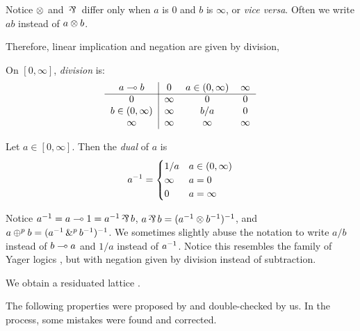 Notice $\otimes{}$ and $\dismul{}$ differ only when $a$ is $0$ and $b$ is $\infty$, or \textit{vice versa}. Often we write $ab$ instead of $a \otimes{} b$.

Therefore, linear implication and negation are given by division, 

\begin{definition}[Division]
\label{Division}
    On $[0,\infty]$, \emph{division} is:
    \begin{equation*}
		\begin{tabular}{c|ccc}
			$a \ediv{} b$ & $0$ & $a \in (0,\infty)$ & $\infty$\\
			\cline{1-4}
			$0$ 			   & $\infty$ & $0$ 		& $0$\\
			$b \in (0,\infty)$ & $\infty$ & $b/a$		& $0$\\
			$\infty$ 		   & $\infty$ & $\infty$ & $\infty$
		\end{tabular}
	\end{equation*}
\end{definition}

\begin{definition}
\label{dual}
    Let $a \in [0,\infty]$. Then the \emph{dual} of $a$ is
    \[  a ^{-1} =
    \begin{cases}
    1/a  & a \in (0,\infty)  \\
    \infty & a = 0 \\
    0 & a = \infty \\
   \end{cases}
    \]
\end{definition}

 Notice $a^{-1} = a \ediv{} 1 = a^{-1} \dismul{} b$, $a \dismul{} b = (a^{-1} \conmul{} b^{-1})^{-1}$, and $a \oplus^{p} b = (a^{-1} \,\&^{p}\, b^{-1})^{-1}$. We sometimes slightly abuse the notation to write $a/b$ instead of $b \multimap a$ and $1/a$ instead of $a ^{-1}$. Notice this resembles the family of Yager logics \cite{cintula2011handbook}, but with negation given by division instead of subtraction.

We obtain a residuated lattice \citep{galatos2007residuated}.


The following properties were proposed by \citeauthor{capucci2024quantifiers} and double-checked by us. In the process, some mistakes were found and corrected. 

